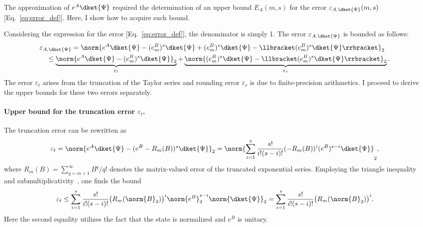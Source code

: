 The approximation of $e^A\dket{\Psi}$ required the determination of an upper bound $E_A(m,s)$ for the error $\varepsilon_{A,\dket{\Psi}}(m,s)$ [Eq.~\eqref{eq:error_def}]. Here, I show how to acquire such bound.

Considering the expression for the error [Eq.~\eqref{eq:error_def}], the denominator is simply 1. The error $\varepsilon_{A,\dket{\Psi}}$ is bounded as follows:
\begin{align}
\nonumber    &\varepsilon_{A,\dket{\Psi}}
    =\norm{e^A\dket{\Psi}-(e^B_m)^s\dket{\Psi}+(e^B_m)^s\dket{\Psi}-\llbracket (e^B_m)^s\dket{\Psi}\rrbracket}_2\\
\nonumber    &\quad \leq \underbrace{\norm{e^A\dket{\Psi}-(e^B_m)^s\dket{\Psi}}_2}_{\varepsilon_t}+\underbrace{\norm{(e^B_m)^s\dket{\Psi}-\llbracket (e^B_m)^s\dket{\Psi}\rrbracket}_2}_{\varepsilon_r}.\\
\label{eq:epsilonA}
\end{align}
The error $\varepsilon_t$ arises from the truncation of the Taylor series and rounding error $\varepsilon_r$ is due to finite-precision arithmetics. I proceed to derive the upper bounds for these two errors separately.

\paragraph{Upper bound for the truncation error \texorpdfstring{$\varepsilon_t$}{epsilon\_t}.}
The truncation error can be rewritten as
\begin{equation}
    \varepsilon_t = \norm{e^A\dket{\Psi}-(e^B-R_m(B))^s\dket{\Psi}}_2=  \norm{\sum_{i=1}^{s}\frac{s!}{i!(s-i)!} (-R_m(B))^i(e^B)^{s-i}\dket{\Psi}}_2,
\end{equation}
where $R_m(B)=\sum_{q=m+1}^{\infty}B^q/q!$ denotes the matrix-valued error of the truncated exponential series.
Employing the triangle inequality and submultiplicativity~\cite{higham2002accuracy}, one finds the bound
\begin{equation}
    \varepsilon_t \leq 
    \sum_{i=1}^{s}\frac{s!}{i!(s-i)!}\big(R_m(\norm{B}_2)\big)^i\norm{e^B}_2^{s-i}\norm{\dket{\Psi}}_2=\sum_{i=1}^{s}\frac{s!}{i!(s-i)!}\big(R_m(\norm{B}_2)\big)^i.
\end{equation}
Here the second equality utilizes the fact that the state is normalized and $e^B$ is unitary. 

